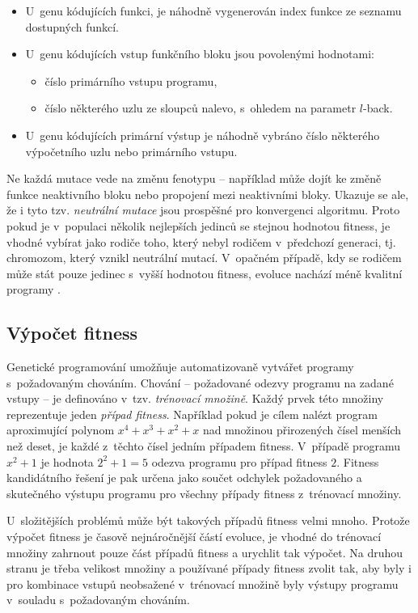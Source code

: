 \begin{itemize}
    \item U~genu kódujících funkci, je náhodně vygenerován index funkce ze seznamu dostupných funkcí.
    \item U~genu kódujících vstup funkčního bloku jsou povolenými hodnotami:
        \begin{itemize}
            \item číslo primárního vstupu programu,
            \item číslo některého uzlu ze sloupců nalevo, s~ohledem na parametr $l$-back.
        \end{itemize}
    \item U~genu kódujících primární výstup je náhodně vybráno číslo některého výpočetního uzlu nebo primárního vstupu.
\end{itemize}

Ne každá mutace vede na změnu fenotypu -- například může dojít ke změně funkce neaktivního bloku nebo propojení mezi neaktivními bloky. Ukazuje se ale, že i tyto tzv. \emph{neutrální mutace} jsou prospěšné pro konvergenci algoritmu. Proto pokud je v~populaci několik nejlepších jedinců se stejnou hodnotou fitness, je vhodné vybírat jako rodiče toho, který nebyl rodičem v~předchozí generaci, tj. chromozom, který vznikl neutrální mutací. V~opačném případě, kdy se rodičem může stát pouze jedinec s~vyšší hodnotou fitness, evoluce nachází méně kvalitní programy \cite{ZelenaCGP, Modra}.

\subsection{Výpočet fitness}
\label{secFitnessCalc}

Genetické programování umožňuje automatizovaně vytvářet programy s~požadovaným chováním. Chování -- požadované odezvy programu na zadané vstupy -- je definováno v~tzv. \emph{trénovací množině}. Každý prvek této množiny reprezentuje jeden \emph{případ fitness}. Například pokud je cílem nalézt program aproximující polynom $x^4 + x^3 + x^2 +x$ nad množinou přirozených čísel menších než deset, je každé z~těchto čísel jedním případem fitness. V~případě programu $x^2 + 1$ je hodnota $2^2 + 1 = 5$ odezva programu pro případ fitness $2$. Fitness kandidátního řešení je pak určena jako součet odchylek požadovaného a skutečného výstupu programu pro všechny případy fitness z~trénovací množiny.

U~složitějších problémů může být takových případů fitness velmi mnoho. Protože výpočet fitness je časově nejnáročnější částí evoluce, je vhodné do trénovací množiny zahrnout pouze část případů fitness a urychlit tak výpočet. Na druhou stranu je třeba velikost množiny a používané případy fitness zvolit tak, aby byly i pro kombinace vstupů neobsažené v~trénovací množině byly výstupy programu v~souladu s~požadovaným chováním.

